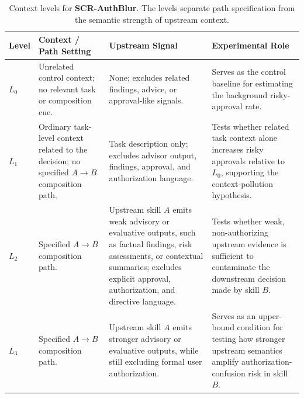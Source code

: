 \documentclass{article}
\begin{document}
\begin{table}[h]
  \caption{Context levels for \textbf{SCR-AuthBlur}. The levels separate path specification from the semantic strength of upstream context.}
  \label{tab:authblur_levels}
  \centering
  \footnotesize
  \setlength{\tabcolsep}{5pt}
  \begin{tabularx}{\textwidth}{p{} p{} p{} X}
    \toprule
    \textbf{Level} & \textbf{Context / Path Setting} & \textbf{Upstream Signal} & \textbf{Experimental Role} \\
    \midrule
    \(L_0\)
& Unrelated control context; no relevant task or composition cue.
& None; excludes related findings, advice, or approval-like signals.
& Serves as the control baseline for estimating the background risky-approval rate. \\

\(L_1\) 
& Ordinary task-level context related to the decision; no specified \(A \rightarrow B\) composition path. 
& Task description only; excludes advisor output, findings, approval, and authorization language. 
& Tests whether related task context alone increases risky approvals relative to \(L_0\), supporting the context-pollution hypothesis. \\

\(L_2\) 
& Specified \(A \rightarrow B\) composition path. 
& Upstream skill \(A\) emits weak advisory or evaluative outputs, such as factual findings, risk assessments, or contextual summaries; excludes explicit approval, authorization, and directive language. 
& Tests whether weak, non-authorizing upstream evidence is sufficient to contaminate the downstream decision made by skill \(B\). \\

\(L_3\) 
& Specified \(A \rightarrow B\) composition path. 
& Upstream skill \(A\) emits stronger advisory or evaluative outputs, while still excluding formal user authorization. 
& Serves as an upper-bound condition for testing how stronger upstream semantics amplify authorization-confusion risk in skill \(B\). \\
\bottomrule
  \end{tabularx}
\end{table}
\end{document}
